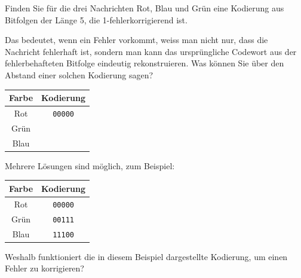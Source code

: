 \begin{myexercise}\label{ex:fehlerkorrektur}
Finden Sie für die drei Nachrichten Rot, Blau und Grün eine Kodierung aus Bitfolgen der Länge 5, die 1-fehlerkorrigierend ist. 

Das bedeutet, wenn ein Fehler vorkommt, weiss man nicht nur, dass die Nachricht fehlerhaft ist, sondern man kann das ursprüngliche Codewort aus der fehlerbehafteten Bitfolge eindeutig rekonstruieren. Was können Sie über den Abstand einer solchen Kodierung sagen?

\begin{table}[H]
\centering
\begin{tabular}{c|c}
\textbf{Farbe} & \textbf{Kodierung} \\\midrule\midrule
Rot & \texttt{00000} \\\midrule
Grün & \\\midrule
Blau & \\
\end{tabular}
\end{table}
\begin{myanswer}
Mehrere Lösungen sind möglich, zum Beispiel:

\begin{table}[H]
\centering
\begin{tabular}{c|c}
\textbf{Farbe} & \textbf{Kodierung} \\\midrule\midrule
Rot & \texttt{00000} \\\midrule
Grün & \texttt{00111}\\\midrule
Blau & \texttt{11100}\\
\end{tabular}
\end{table}
Weshalb funktioniert die in diesem Beispiel dargestellte Kodierung, um einen Fehler zu korrigieren?


\end{myanswer}
\end{myexercise}
